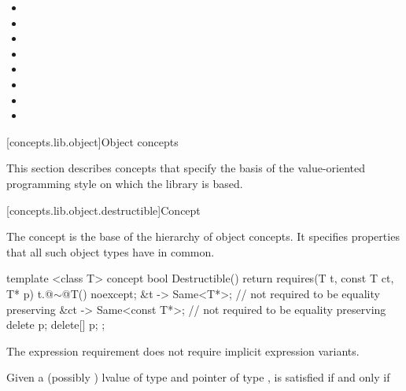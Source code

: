 \begin{addedblock}
\begin{itemdescr}
\begin{itemize}
\item {}
\item {}
\item {}
\item {}
\item {}
\item {}
\item {}
\item {}
\end{itemize}
\end{itemdescr}

[concepts.lib.object]{Object concepts}

\pnum
This section describes concepts that specify the basis of the
value-oriented programming style on which the library is based.

[concepts.lib.object.destructible]{Concept }

\pnum
The  concept is the base of the hierarchy of object concepts.
It specifies properties that all such object types have in common.

%
\begin{itemdecl}
template <class T>
concept bool Destructible() {
  return requires(T t, const T ct, T* p) {
    { t.@$\sim$@T() } noexcept;
    { &t } -> Same<T*>; // not required to be equality preserving
    { &ct } -> Same<const T*>; // not required to be equality preserving
    delete p;
    delete[] p;
  };
}
\end{itemdecl}

\begin{itemdescr}
\pnum
The expression requirement  does not require implicit expression variants.

\pnum
Given a (possibly ) lvalue  of type  and pointer
 of type ,  is satisfied if and only if


\end{itemdescr}
\end{addedblock}
